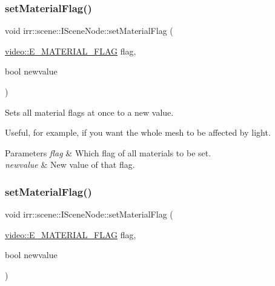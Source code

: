 \subsubsection{\texorpdfstring{set\+Material\+Flag()}{setMaterialFlag()}\hspace{0.1cm}{\footnotesize\ttfamily [1/2]}}
{\footnotesize\ttfamily void irr\+::scene\+::\+I\+Scene\+Node\+::set\+Material\+Flag (\begin{DoxyParamCaption}\item[{\hyperlink{namespaceirr_1_1video_a8a3bc00ae8137535b9fbc5f40add70d3}{video\+::\+E\+\_\+\+M\+A\+T\+E\+R\+I\+A\+L\+\_\+\+F\+L\+AG}}]{flag,  }\item[{bool}]{newvalue }\end{DoxyParamCaption})\hspace{0.3cm}{\ttfamily [inline]}}



Sets all material flags at once to a new value. 

Useful, for example, if you want the whole mesh to be affected by light. 
\begin{DoxyParams}{Parameters}
{\em flag} & Which flag of all materials to be set. \\
\hline
{\em newvalue} & New value of that flag. \\
\hline
\end{DoxyParams}
\mbox{\label{classirr_1_1scene_1_1ISceneNode_a2841d5077854b9981711a403f33762cd}} 
\subsubsection{\texorpdfstring{set\+Material\+Flag()}{setMaterialFlag()}\hspace{0.1cm}{\footnotesize\ttfamily [2/2]}}
{\footnotesize\ttfamily void irr\+::scene\+::\+I\+Scene\+Node\+::set\+Material\+Flag (\begin{DoxyParamCaption}\item[{\hyperlink{namespaceirr_1_1video_a8a3bc00ae8137535b9fbc5f40add70d3}{video\+::\+E\+\_\+\+M\+A\+T\+E\+R\+I\+A\+L\+\_\+\+F\+L\+AG}}]{flag,  }\item[{bool}]{newvalue }\end{DoxyParamCaption})\hspace{0.3cm}{\ttfamily [inline]}}



